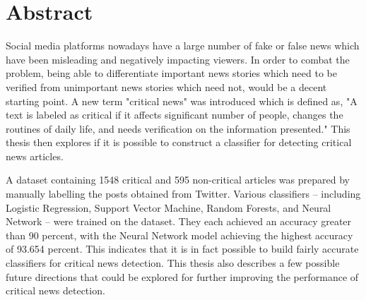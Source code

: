 \chapter*{Abstract}
\makeabstract

Social media platforms nowadays have a large number of fake or false news which have been misleading and negatively impacting viewers. In order to combat the problem, being able to differentiate important news stories which need to be verified from unimportant news stories which need not, would be a decent starting point. A new term "critical news" was introduced which is defined as, "A text is labeled as critical if it affects significant number of people, changes the routines of daily life, and needs verification on the information presented." This thesis then explores if it is possible to construct a classifier for detecting critical news articles.

A dataset containing 1548 critical and 595 non-critical articles was prepared by manually labelling the posts obtained from Twitter. Various classifiers -- including Logistic Regression, Support Vector Machine, Random Forests, and Neural Network -- were trained on the dataset. They each achieved an accuracy greater than 90 percent, with the Neural Network model achieving the highest accuracy of 93.654 percent. This indicates that it is in fact possible to build fairly accurate classifiers for critical news detection. This thesis also describes a few possible future directions that could be explored for further improving the performance of critical news detection.


\abstractsig
